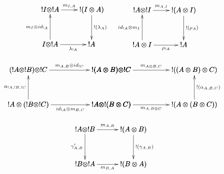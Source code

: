\begin{definition}
\begin{center}
\begin{math}
\begin{array}{c}
\begin{array}{lr}
                    \bfig
                    \square|alrb|/->`<-`->`->/<600,500>[
                        !I \otimes !A`
                        !(I \otimes A)`
                        I \otimes !A`
                        !A;
                        m_{I,A}`
                        m_{I} \otimes id_{!A}`
                        !(\lambda_A)`
                        \lambda_{!A}
                    ]
                    \efig
                    &
                    \bfig
                    \square|alrb|/->`<-`->`->/<600,500>[
                        !A \otimes !I`
                        !(A \otimes I)`
                        !A \otimes I`
                        !A;
                        m_{A,I}`
                        id_{!A} \otimes m_I`
                        !(\rho_A)`
                        \rho_{!A}
                    ]
                    \efig
                \end{array}
                \\\\
                \bfig
                \square|alrb|/->`<-``->/<1200,500>[
                    (!A \otimes !B) \otimes !C`
                    !(A \otimes  B) \otimes !C`
                    !A \otimes (!B \otimes !C)`
                    !A \otimes !(B \otimes  C);
                    m_{A,B} \otimes id_{!C}`
                    \alpha_{!A,!B,!C}`
                    `
                    id_{!A} \otimes m_{B,C}
                ]
                \square(1200,0)|alrb|/->``<-`->/<1200,500>[
                    !(A \otimes  B) \otimes !C`
                    !((A \otimes B)\otimes C)`
                    !A \otimes !(B \otimes  C)`
                    !(A \otimes (B \otimes C));
                    m_{A \otimes B,C}`
                    `
                    !(\alpha_{A,B,C})`
                    m_{A,B \otimes C}
                ]
                \efig
                \\\\
                \bfig
                \square|alrb|<700,500>[
                    !A \otimes !B`
                    !(A \otimes B)`
                    !B \otimes !A`
                    !(B \otimes A);
                    m_{A,B}`
                    \gamma_{A,B}'`
                    !(\gamma_{A,B})`
                    m_{B,A}
                ]
                \efig
            \end{array}
        \end{math}
    \end{center}
    \cite{bierman1993}
\end{definition}

